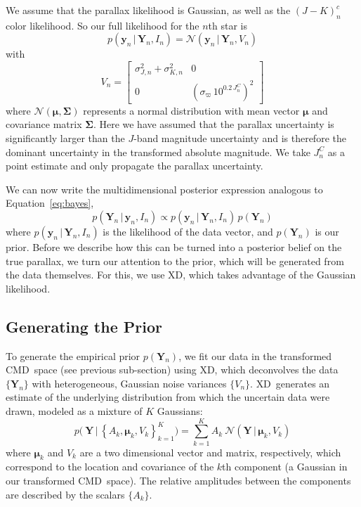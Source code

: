 \documentclass[modern]{aastex61}
\newcommand{\acronym}[1]{{\small{#1}}}
\newcommand{\xd}{\acronym{XD}}
\newcommand{\cmd}{\acronym{CMD}}
\newcommand{\given}{\,|\,}
\begin{document}
We assume that the parallax likelihood is Gaussian, as well as the $(J-K)^c_n$ color likelihood. So our full likelihood for the $n$th star is
\begin{equation}
p(\mathbf{y}_n \given \mathbf{Y}_n, I_n) = \mathcal{N}(\mathbf{y}_n \given \mathbf{Y}_n, V_n)
\end{equation}
with \\
\[
V_n = \begin{bmatrix}
\sigma_{J,n}^2 + \sigma_{K,n}^2 & 0 \\
0 & \left(\sigma_{\varpi}\,10^{0.2\,J_n^C}\right)^2
\end{bmatrix}
\]
where $\mathcal{N}(\boldsymbol{\mu}, \mathbf{\Sigma})$ represents a normal distribution with mean vector $\boldsymbol{\mu}$ and covariance matrix $\mathbf{\Sigma}$.
Here we have assumed that the parallax uncertainty is significantly larger than the $J$-band magnitude uncertainty and is therefore the dominant uncertainty in the transformed absolute magnitude. We take $J_n^C$ as a point estimate and only propagate the parallax uncertainty.

We can now write the multidimensional posterior expression analogous to Equation~\ref{eq:bayes},
\begin{equation}
p(\mathbf{Y}_n \given \mathbf{y}_n, I_n) \propto p(\mathbf{y}_n \given \mathbf{Y}_n, I_n) \, p(\mathbf{Y}_n) \label{eq:posterior}
\end{equation}
where $p(\mathbf{y}_n \given \mathbf{Y}_n, I_n)$ is the likelihood of the data vector, and $p(\mathbf{Y}_n)$ is our prior.
Before we describe how this can be turned into a posterior belief on the true parallax, we turn our attention to the prior, which will be generated from the data themselves. For this, we use XD, which takes advantage of the Gaussian likelihood.

\subsection{Generating the Prior}

To generate the empirical prior $p(\mathbf{Y}_n)$, we fit our data in the transformed \cmd\ space (see previous sub-section) using \xd, which deconvolves the data $\{ \mathbf{Y}_n \}$ with heterogeneous, Gaussian noise variances $\{ V_n\}$. \xd\ generates an estimate of the underlying distribution from which the uncertain data were drawn, modeled as a mixture of $K$ Gaussians:
\begin{equation}
	p\bigl(\ \mathbf{Y} \given  \left\{A_k, \mathbf{\mu}_k, V_k\right\}_{k=1}^K \bigr) = \sum_{k=1}^K A_k \ \mathcal{N}(\mathbf{Y} \given \mathbf{\mu}_k, V_k )
\end{equation}
where $\mathbf{\mu}_k$ and $V_k$ are a two dimensional vector and matrix, respectively, which correspond to the location and covariance of the $k$th component (a Gaussian in our transformed \cmd\ space). The relative amplitudes between the components are described by the scalars $\{ A_k \}$.
\end{document}
